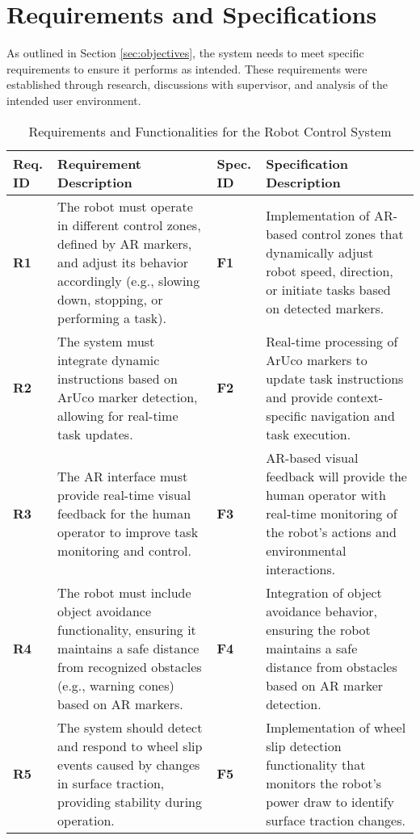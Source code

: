 \chapter{\label{ch:req_and_specs} Requirements and Specifications}

As outlined in Section \ref{sec:objectives}, the system needs to meet specific requirements to ensure it performs as intended. These requirements were established through research, discussions with supervisor, and analysis of the intended user environment.

\begin{table}[h]
	\centering
	\begin{tabular}{|p{0.9cm}|p{6cm}|p{0.9cm}|p{6cm}|}
		\hline
		\textbf{Req. ID} & \textbf{Requirement Description} & \textbf{Spec. ID} & \textbf{Specification Description} \\ \hline
		\textbf{R1} & The robot must operate in different control zones, defined by AR markers, and adjust its behavior accordingly (e.g., slowing down, stopping, or performing a task). & \textbf{F1} & Implementation of AR-based control zones that dynamically adjust robot speed, direction, or initiate tasks based on detected markers. \\ \hline
		\textbf{R2} & The system must integrate dynamic instructions based on ArUco marker detection, allowing for real-time task updates. & \textbf{F2} & Real-time processing of ArUco markers to update task instructions and provide context-specific navigation and task execution. \\ \hline
		\textbf{R3} & The AR interface must provide real-time visual feedback for the human operator to improve task monitoring and control. & \textbf{F3} & AR-based visual feedback will provide the human operator with real-time monitoring of the robot’s actions and environmental interactions. \\ \hline
		\textbf{R4} & The robot must include object avoidance functionality, ensuring it maintains a safe distance from recognized obstacles (e.g., warning cones) based on AR markers. & \textbf{F4} & Integration of object avoidance behavior, ensuring the robot maintains a safe distance from obstacles based on AR marker detection. \\ \hline
		\textbf{R5} & The system should detect and respond to wheel slip events caused by changes in surface traction, providing stability during operation. & \textbf{F5} & Implementation of wheel slip detection functionality that monitors the robot's power draw to identify surface traction changes. \\ \hline
	\end{tabular}
	\caption{Requirements and Functionalities for the Robot Control System}
	\label{tab:requirements_functionalities}
\end{table}


